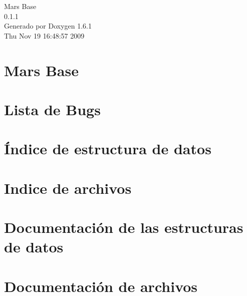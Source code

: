 \documentclass[a4paper]{book}
\begin{document}
\begin{titlepage}
\vspace*{7cm}
\begin{center}
{\Large Mars Base \\[1ex]\large 0.1.1 }\\
\vspace*{1cm}
{\large Generado por Doxygen 1.6.1}\\
\vspace*{0.5cm}
{\small Thu Nov 19 16:48:57 2009}\\
\end{center}
\end{titlepage}
\clearemptydoublepage
{}
\tableofcontents
\clearemptydoublepage
{}
\chapter{Mars Base}
\label{index}
\chapter{Lista de Bugs}
\label{bug}

\chapter{Índice de estructura de datos}

\chapter{Indice de archivos}

\chapter{Documentación de las estructuras de datos}









\chapter{Documentación de archivos}













\printindex
\end{document}
